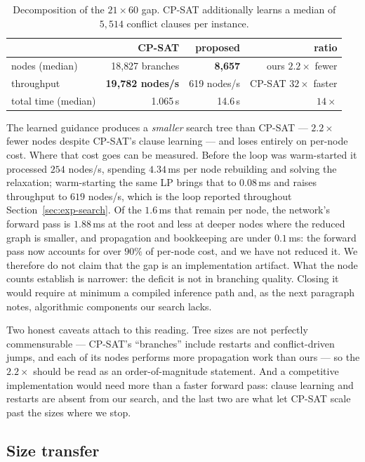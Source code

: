 \documentclass[preprint,12pt]{elsarticle}
\begin{document}
\begin{table}[h]
\centering
\begin{tabular}{lrrr}
\toprule
 & CP-SAT & proposed & ratio \\
\midrule
nodes (median) & 18{,}827 branches & \textbf{8{,}657} & ours $2.2\times$ fewer \\
throughput & \textbf{19{,}782 nodes/s} & 619 nodes/s & CP-SAT $32\times$ faster \\
total time (median) & 1.065\,s & 14.6\,s & $14\times$ \\
\bottomrule
\end{tabular}
\caption{Decomposition of the $21\times60$ gap. CP-SAT additionally learns a median of $5{,}514$ conflict clauses per instance.}
\label{tab:decomp}
\end{table}

The learned guidance produces a \emph{smaller} search tree than CP-SAT --- $2.2\times$ fewer nodes despite CP-SAT's clause learning --- and loses entirely on per-node cost. Where that cost goes can be measured. Before the loop was warm-started it processed $254$ nodes/s, spending $4.34$\,ms per node rebuilding and solving the relaxation; warm-starting the same LP brings that to $0.08$\,ms and raises throughput to $619$ nodes/s, which is the loop reported throughout Section~\ref{sec:exp-search}. Of the $1.6$\,ms that remain per node, the network's forward pass is $1.88$\,ms at the root and less at deeper nodes where the reduced graph is smaller, and propagation and bookkeeping are under $0.1$\,ms: the forward pass now accounts for over $90\%$ of per-node cost, and we have not reduced it. We therefore do not claim that the gap is an implementation artifact. What the node counts establish is narrower: the deficit is not in branching quality. Closing it would require at minimum a compiled inference path and, as the next paragraph notes, algorithmic components our search lacks.

Two honest caveats attach to this reading. Tree sizes are not perfectly commensurable --- CP-SAT's ``branches'' include restarts and conflict-driven jumps, and each of its nodes performs more propagation work than ours --- so the $2.2\times$ should be read as an order-of-magnitude statement. And a competitive implementation would need more than a faster forward pass: clause learning and restarts are absent from our search, and the last two are what let CP-SAT scale past the sizes where we stop.

\subsection{Size transfer}
\label{sec:exp-transfer}
\end{document}
